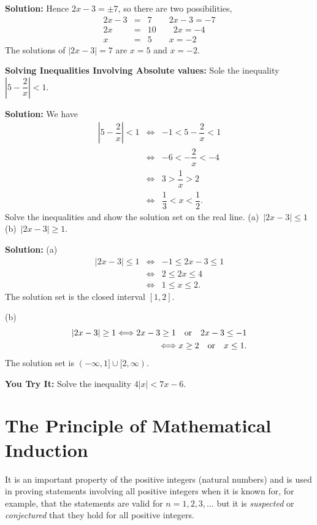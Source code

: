 \documentclass[titlepage,a4paper,12pt]{report}
\begin{document}
\noindent \textbf{Solution:} Hence $2x-3=\pm 7$, so there are two possibilities, 
\begin{eqnarray*}
2x-3 &=& 7 \quad  \quad 2x-3 =-7\\
2x &=& 10 \quad \quad 2x = -4\\
x &=& 5 \quad \quad x = -2
\end{eqnarray*}
The solutions of $|2x-3|=7$ are $x=5$ and $x=-2$.

\noindent \textbf{Solving Inequalities Involving Absolute values:} Sole the inequality $\left |5-\dfrac{2}{x}\right |<1$.

\textbf{Solution:} We have  
\begin{eqnarray*}
\left |5-\dfrac{2}{x}\right |<1 & \Longleftrightarrow &  -1<5-\dfrac{2}{x}<1\\
& \Longleftrightarrow & -6<-\dfrac{2}{x}<-4\\
 & \Longleftrightarrow & 3>\dfrac{1}{x}> 2\\
& \Longleftrightarrow  & \dfrac{1}{3}<x<\dfrac{1}{2}.
\end{eqnarray*}
Solve the inequalities and show the solution set on the real line. (a)\, $|2x-3|\leq 1$ \quad (b)\, $|2x-3|\geq 1$.

\noindent \textbf{Solution:} (a)\begin{eqnarray*}
|2x-3|\leq 1  & \Longleftrightarrow & -1\leq 2x-3 \leq 1\\
& \Longleftrightarrow &  2\leq 2x\leq 4\\
 &\Longleftrightarrow & 1\leq x\leq 2.
\end{eqnarray*}
The solution set is the closed interval $[1,2]$.

\noindent (b)\begin{eqnarray*}
|2x-3|\geq 1\Longleftrightarrow 2x-3\geq 1 \quad \hbox{or} \quad 2x-3 \leq -1 \\
\Longleftrightarrow x \geq 2 \quad \hbox{or} \quad x\leq 1.
\end{eqnarray*}
The solution set is $(-\infty , 1]\cup [2, \infty )$.

\noindent \textbf{You Try It:} Solve the inequality $4|x|<7x-6$.
\section{The Principle of Mathematical Induction}
It is an important property of the positive integers (natural numbers) and is used in proving statements involving all positive integers when it is known for, for example, that the statements are valid for $n=1,2,3,\dots $ but it is \textit{suspected} or \textit{conjectured} that they hold for all positive integers.
\end{document}
